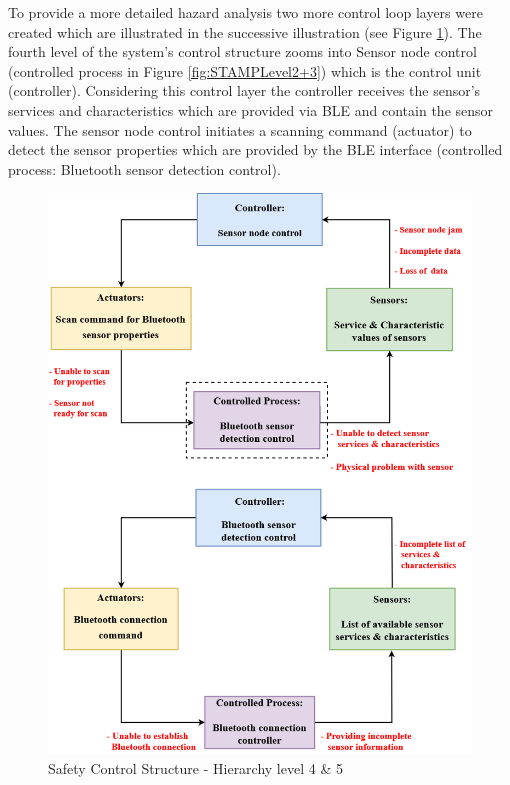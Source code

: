 \documentclass[review]{elsarticle}
\begin{document}
\begin{itemize}
 	To provide a more detailed hazard analysis two more control loop layers were created which are illustrated in the successive illustration (see Figure  \ref{fig:STAMPLevel4+5}). The fourth level of the system's control structure zooms into Sensor node control (controlled process in Figure \ref{fig:STAMPLevel2+3}) which is the control unit (controller). Considering this control layer the controller receives the sensor's services and characteristics which are provided via BLE and contain the sensor values. The sensor node control initiates a scanning command (actuator) to detect the sensor properties which are provided by the BLE interface (controlled process: Bluetooth sensor detection control).  
	
	\begin{figure}[!ht]
		\centering
		\includegraphics[scale=0.325]{Images/STAMP4+5level(2)}
		\caption[Safety Control Structure - Hierarchy level 4 \& 5]{Safety Control Structure - Hierarchy level 4 \& 5}
		\label{fig:STAMPLevel4+5}
	\end{figure}
    

\end{itemize}
\end{document}
